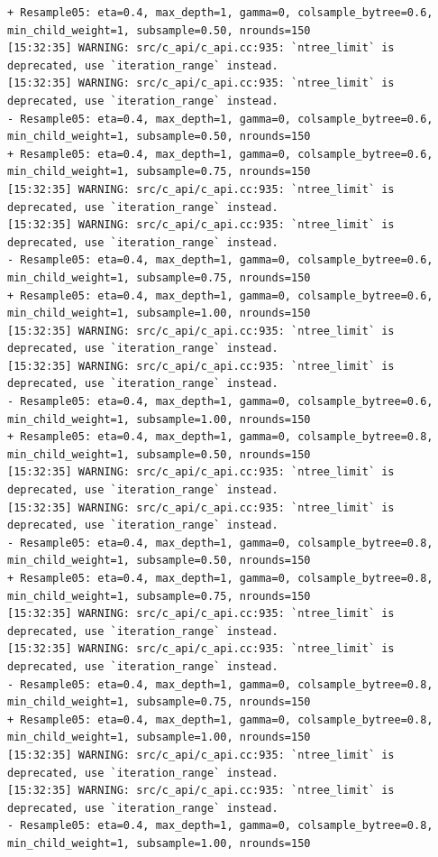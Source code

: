 \documentclass[
  letterpaper,
  DIV=11,
  numbers=noendperiod]{scrartcl}
\begin{document}
\begin{verbatim}
+ Resample05: eta=0.4, max_depth=1, gamma=0, colsample_bytree=0.6, min_child_weight=1, subsample=0.50, nrounds=150 
[15:32:35] WARNING: src/c_api/c_api.cc:935: `ntree_limit` is deprecated, use `iteration_range` instead.
[15:32:35] WARNING: src/c_api/c_api.cc:935: `ntree_limit` is deprecated, use `iteration_range` instead.
- Resample05: eta=0.4, max_depth=1, gamma=0, colsample_bytree=0.6, min_child_weight=1, subsample=0.50, nrounds=150 
+ Resample05: eta=0.4, max_depth=1, gamma=0, colsample_bytree=0.6, min_child_weight=1, subsample=0.75, nrounds=150 
[15:32:35] WARNING: src/c_api/c_api.cc:935: `ntree_limit` is deprecated, use `iteration_range` instead.
[15:32:35] WARNING: src/c_api/c_api.cc:935: `ntree_limit` is deprecated, use `iteration_range` instead.
- Resample05: eta=0.4, max_depth=1, gamma=0, colsample_bytree=0.6, min_child_weight=1, subsample=0.75, nrounds=150 
+ Resample05: eta=0.4, max_depth=1, gamma=0, colsample_bytree=0.6, min_child_weight=1, subsample=1.00, nrounds=150 
[15:32:35] WARNING: src/c_api/c_api.cc:935: `ntree_limit` is deprecated, use `iteration_range` instead.
[15:32:35] WARNING: src/c_api/c_api.cc:935: `ntree_limit` is deprecated, use `iteration_range` instead.
- Resample05: eta=0.4, max_depth=1, gamma=0, colsample_bytree=0.6, min_child_weight=1, subsample=1.00, nrounds=150 
+ Resample05: eta=0.4, max_depth=1, gamma=0, colsample_bytree=0.8, min_child_weight=1, subsample=0.50, nrounds=150 
[15:32:35] WARNING: src/c_api/c_api.cc:935: `ntree_limit` is deprecated, use `iteration_range` instead.
[15:32:35] WARNING: src/c_api/c_api.cc:935: `ntree_limit` is deprecated, use `iteration_range` instead.
- Resample05: eta=0.4, max_depth=1, gamma=0, colsample_bytree=0.8, min_child_weight=1, subsample=0.50, nrounds=150 
+ Resample05: eta=0.4, max_depth=1, gamma=0, colsample_bytree=0.8, min_child_weight=1, subsample=0.75, nrounds=150 
[15:32:35] WARNING: src/c_api/c_api.cc:935: `ntree_limit` is deprecated, use `iteration_range` instead.
[15:32:35] WARNING: src/c_api/c_api.cc:935: `ntree_limit` is deprecated, use `iteration_range` instead.
- Resample05: eta=0.4, max_depth=1, gamma=0, colsample_bytree=0.8, min_child_weight=1, subsample=0.75, nrounds=150 
+ Resample05: eta=0.4, max_depth=1, gamma=0, colsample_bytree=0.8, min_child_weight=1, subsample=1.00, nrounds=150 
[15:32:35] WARNING: src/c_api/c_api.cc:935: `ntree_limit` is deprecated, use `iteration_range` instead.
[15:32:35] WARNING: src/c_api/c_api.cc:935: `ntree_limit` is deprecated, use `iteration_range` instead.
- Resample05: eta=0.4, max_depth=1, gamma=0, colsample_bytree=0.8, min_child_weight=1, subsample=1.00, nrounds=150 

\end{verbatim}
\end{document}
